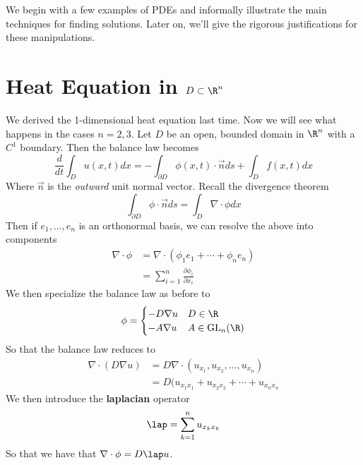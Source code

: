 \documentclass{bkcnotes}
\begin{document}
\maketitle

We begin with a few examples of PDEs and informally illustrate the
main techniques for finding solutions. Later on, we'll give the
rigorous justifications for these manipulations. 

\section{Heat Equation in $D \subset \R^n$}
We derived the 1-dimensional heat equation last time. Now we will see
what happens in the cases $n=2,3$. Let $D$ be an open, bounded domain
in $\R^n$ with a $C^1$ boundary. Then the balance law becomes
\begin{equation}
  \label{eq:heat-balance}
  \frac{d}{dt}\int_{D} u(x,t)dx =
  -\int_{\partial D} \phi(x,t) \cdot \vec{n}ds + \int_{D}f(x,t)dx
\end{equation}
Where $\vec{n}$ is the \textit{outward} unit normal vector. Recall the
divergence theorem
\begin{equation}
  \int_{\partial D} \phi \cdot \vec{n}ds =
  \int_{D} \nabla \cdot \phi dx
\end{equation}
Then if $e_1,\ldots,e_n$ is an orthonormal basis, we can resolve the
above into components
\begin{equation}
  \begin{aligned}
    \nabla \cdot \phi &= \nabla \cdot (\phi_1e_1 + \cdots + \phi_ne_n) \\
    &= \sum_{i=1}^n \frac{\partial \phi_i}{\partial x_i}
  \end{aligned}
\end{equation}
We then specialize the balance law as before to
\begin{equation}
  \phi = \begin{cases}
    -D\nabla u & D \in \R \\
    -A\nabla u & A \in \text{GL}_n(\R)
  \end{cases}
\end{equation}
So that the balance law reduces to
\begin{equation}
  \begin{aligned}
    \nabla \cdot (D\nabla u) &= D \nabla \cdot (u_{x_1},u_{x_2}, \ldots, u_{x_n}) \\
    &= D (u_{x_1x_1} + u_{x_2x_2} + \cdots + u_{x_nx_n}    
  \end{aligned}
\end{equation}
We then introduce the \textbf{laplacian} operator
\begin{equation}
  \label{eq:laplace-op}
  \lap = \sum_{k=1}^n u_{x_kx_k}
\end{equation}
So that we have that $\nabla \cdot \phi = D \lap u$.
\end{document}
